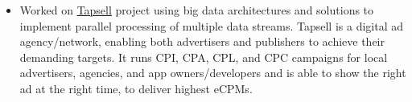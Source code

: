 \documentclass[10pt,a4paper,ragged2e]{altacv}
\begin{document}

    \begin{fullwidth}
        \makecvheader
    \end{fullwidth}




    \divider

    \begin{itemize}
        \item
        {Worked on {\href{https://tapsell.ir}{Tapsell}} project using big data architectures and solutions to implement parallel
        processing of multiple data streams.
        Tapsell is a digital ad agency/network, enabling both advertisers and publishers to achieve their demanding targets.
        It runs CPI, CPA, CPL, and CPC campaigns for local advertisers,
        agencies, and app owners/developers and is able to show the right ad at the right time, to deliver highest eCPMs.}
    \end{itemize}
\end{document}
